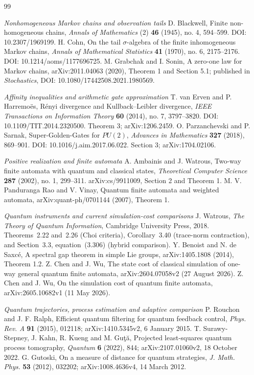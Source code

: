 \begin{thebibliography}{99}
\item[]\textit{Nonhomogeneous Markov chains and observation tails}
 D. Blackwell, Finite non-homogeneous chains, \emph{Annals of Mathematics} (2) \textbf{46} (1945), no. 4, 594--599. DOI: 10.2307/1969199.
 H. Cohn, On the tail $\sigma$-algebra of the finite inhomogeneous Markov chains, \emph{Annals of Mathematical Statistics} \textbf{41} (1970), no. 6, 2175--2176. DOI: 10.1214/aoms/1177696725.
 M. Grabchak and I. Sonin, A zero-one law for Markov chains, arXiv:2011.04063 (2020), Theorem 1 and Section 5.1; published in \emph{Stochastics}, DOI: 10.1080/17442508.2021.1980569.
\item[]\textit{Affinity inequalities and arithmetic gate approximation}
 T. van Erven and P. Harremo\"es, R\'enyi divergence and Kullback--Leibler divergence, \emph{IEEE Transactions on Information Theory} \textbf{60} (2014), no. 7, 3797--3820. DOI: 10.1109/TIT.2014.2320500. Theorem 3; arXiv:1206.2459.
 O. Parzanchevski and P. Sarnak, Super-Golden-Gates for $PU(2)$, \emph{Advances in Mathematics} \textbf{327} (2018), 869--901. DOI: 10.1016/j.aim.2017.06.022. Section 3; arXiv:1704.02106.
\item[]\textit{Positive realization and finite automata}
 A. Ambainis and J. Watrous, Two-way finite automata with quantum and classical states, \emph{Theoretical Computer Science} \textbf{287} (2002), no. 1, 299--311. arXiv:cs/9911009, Section 2 and Theorem 1.
 M. V. Panduranga Rao and V. Vinay, Quantum finite automata and weighted automata, arXiv:quant-ph/0701144 (2007), Theorem 1.

\item[]\textit{Quantum instruments and current simulation-cost comparisons}
 J. Watrous, \emph{The Theory of Quantum Information},
Cambridge University Press, 2018. Theorems~2.22 and~2.26
(Choi criteria), Corollary~3.40 (trace-norm contraction),
and Section~3.3, equation~(3.306) (hybrid comparison).
 Y. Benoist and N. de Saxc\'e, A spectral gap theorem
in simple Lie groups, arXiv:1405.1808 (2014), Theorem 1.2.
 Z. Chen and J. Wu, The state cost of classical
simulation of one-way general quantum finite automata,
arXiv:2604.07058v2 (27 August 2026).
 Z. Chen and J. Wu, On the simulation cost of
quantum finite automata, arXiv:2605.10682v1 (11 May 2026).

\item[]\textit{Quantum trajectories, process estimation and adaptive comparison}
 P. Rouchon and J. F. Ralph,
Efficient quantum filtering for quantum feedback control,
\emph{Phys. Rev. A} \textbf{91} (2015), 012118;
arXiv:1410.5345v2, 6 January 2015.
 T. Surawy-Stepney, J. Kahn, R. Kueng and M. Gu\c{t}\u{a},
Projected least-squares quantum process tomography,
\emph{Quantum} \textbf{6} (2022), 844;
arXiv:2107.01060v2, 18 October 2022.
 G. Gutoski,
On a measure of distance for quantum strategies,
\emph{J. Math. Phys.} \textbf{53} (2012), 032202;
arXiv:1008.4636v4, 14 March 2012.


\end{thebibliography}
